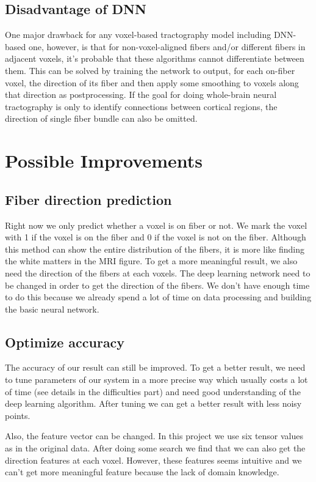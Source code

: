 \documentclass[10pt,twocolumn,letterpaper]{article}
\begin{document}
	\subsection{Disadvantage of DNN}
	One major drawback for any voxel-based tractography model including DNN-based one, however, is that for non-voxel-aligned fibers and/or different fibers in adjacent voxels, it’s probable that these algorithms cannot differentiate between them. This can be solved by training the network to output, for each on-fiber voxel, the direction of its fiber and then apply some smoothing to voxels along that direction as postprocessing. If the goal for doing whole-brain neural tractography is only to identify connections between cortical regions, the direction of single fiber bundle can also be omitted.
	
	
	\section{Possible Improvements}
	
	\subsection{Fiber direction prediction}
	Right now we only predict whether a voxel is on fiber or not. We mark the voxel with 1 if the voxel is on the fiber and 0 if the voxel is not on the fiber. Although this method can show the entire distribution of the fibers, it is more like finding the white matters in the MRI figure. To get a more meaningful result, we also need the direction of the fibers at each voxels. The deep learning network need to be changed in order to get the direction of the fibers. We don't have enough time to do this because we already spend a lot of time on data processing and building the basic neural network. 
	
	
	\subsection{Optimize accuracy}
	The accuracy of our result can still be improved. To get a better result, we need to tune parameters of our system in a more precise way which usually costs a lot of time (see details in the difficulties part) and need good understanding of the deep learning algorithm. After tuning we can get a better result with less noisy points.
	
	Also, the feature vector can be changed. In this project we use six tensor values as in the original data. After doing some search we find that we can also get the direction features at each voxel. However, these features seems intuitive and we can't get more meaningful feature because the lack of domain knowledge.
	
\end{document}
